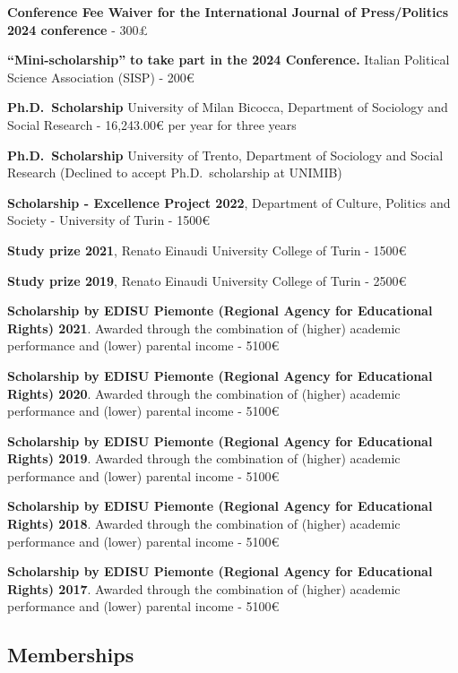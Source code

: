 \documentclass[10pt,]{article}
\renewenvironment{itemize}{
  \begin{list}{}{
    \setlength{\leftmargin}{1.5em}
  }
}{
  \end{list}
}
\begin{document}
\begin{itemize}
\item
  \textbf{Conference Fee Waiver for the International Journal of
  Press/Politics 2024 conference} - 300£
\item
  \textbf{``Mini-scholarship''} \textbf{to take part in the 2024
  Conference.} Italian Political Science Association (SISP) - 200€
\item
  \textbf{Ph.D.~Scholarship} University of Milan Bicocca, Department of
  Sociology and Social Research - 16,243.00€ per year for three years
\item
  \textbf{Ph.D.~Scholarship} University of Trento, Department of
  Sociology and Social Research (Declined to accept Ph.D.~scholarship at
  UNIMIB)
\item
  \textbf{Scholarship - Excellence Project 2022}, Department of Culture,
  Politics and Society - University of Turin - 1500€
\item
  \textbf{Study prize 2021}, Renato Einaudi University College of Turin
  - 1500€
\item
  \textbf{Study prize 2019}, Renato Einaudi University College of Turin
  - 2500€
\item
  \textbf{Scholarship by EDISU Piemonte (Regional Agency for Educational
  Rights) 2021}. Awarded through the combination of (higher) academic
  performance and (lower) parental income - 5100€
\item
  \textbf{Scholarship by EDISU Piemonte (Regional Agency for Educational
  Rights) 2020}. Awarded through the combination of (higher) academic
  performance and (lower) parental income - 5100€
\item
  \textbf{Scholarship by EDISU Piemonte (Regional Agency for Educational
  Rights) 2019}. Awarded through the combination of (higher) academic
  performance and (lower) parental income - 5100€
\item
  \textbf{Scholarship by EDISU Piemonte (Regional Agency for Educational
  Rights) 2018}. Awarded through the combination of (higher) academic
  performance and (lower) parental income - 5100€
\item
  \textbf{Scholarship by EDISU Piemonte (Regional Agency for Educational
  Rights) 2017}. Awarded through the combination of (higher) academic
  performance and (lower) parental income - 5100€
\end{itemize}

\subsection{Memberships}\label{memberships}
\end{document}

